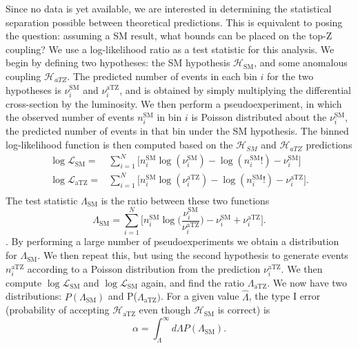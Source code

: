 \documentclass[preprint]{JHEP3} %
\newcommand{\SM}{\mathrm{SM}}
\newcommand{\aTZ}{\mathrm{aTZ}}
\def\hLambda {\hat{\Lambda}}
\begin{document}
Since no data is yet available, we are interested in determining the statistical separation possible between theoretical predictions. This is equivalent to posing the question: assuming a SM result, what bounds can be placed on the top-Z coupling? 
We use a log-likelihood ratio as a test statistic for this analysis. We begin by defining two hypotheses: the SM hypothesis $\mathcal{H}_{\mathrm{SM}}$, and some anomalous coupling $\mathcal{H}_{aTZ}$. The predicted number of events in each bin $i$ for the two hypotheses is $\nu_i^{\mathrm{SM}}$ and $\nu_i^{\aTZ}$, and is obtained by simply multiplying the differential cross-section by the luminosity. We then perform a pseudoexperiment, in which the observed number of events $n_i^{\SM}$ in bin $i$ is Poisson distributed about the $\nu_i^{\mathrm{SM}}$, the predicted number of events in that bin under the SM hypothesis.  The binned log-likelihood function is then computed based on the $\mathcal{H}_{SM}$ and $\mathcal{H}_{aTZ}$ predictions
\begin{equation}
\begin{split}
\log\mathcal{L}_{\SM}  =& \sum_{i=1}^N \bigl[ n_i^{\SM}\log(\nu_i^{\SM})-\log(n_i^{\SM}!) -\nu_i^{\SM} \bigr] \\
\log\mathcal{L}_{\aTZ}  =& \sum_{i=1}^N \bigl[ n_i^{\SM}\log(\nu_i^{\aTZ})-\log(n_i^{\SM}!) -\nu_i^{\aTZ} \bigr]. \\
\end{split}
\end{equation}
The test statistic $\Lambda_{\SM}$ is the ratio between these two functions 
\begin{equation}
\Lambda_{\SM} = \sum_{i=1}^N \bigl[ n_i^{\SM}\log \bigl( \frac{\nu_i^{\SM}}{\nu_i^{\aTZ}} \bigr) -\nu_i^{\SM} + \nu_i^{\aTZ} \bigr]. 
\end{equation}.
By performing a large number of pseudoexperiments we obtain a distribution for $\Lambda_{\SM}$. We then repeat this, but using the second hypothesis to generate events $n_i^{\aTZ}$ according to a Poisson distribution from the prediction $\nu_i^{\aTZ}$. We then compute $\log\mathcal{L}_{\SM}$ and $\log\mathcal{L}_{\SM}$ again, and find the ratio $\Lambda_{\aTZ}$. We now have two distributions: $P(\Lambda_{\SM})$ and P($\Lambda_{\aTZ})$. For a given value $\hat{\Lambda}$, the type I error (probability of accepting $\mathcal{H}_{\aTZ}$ even though $\mathcal{H}_{\SM}$ is correct) is
\begin{equation}
\alpha = \int_{\hLambda}^{\infty} d\Lambda P(\Lambda_{\SM}).
\end{equation}
\end{document}
